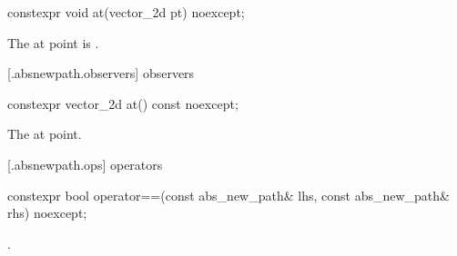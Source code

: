 %
\begin{itemdecl}
constexpr void at(vector_2d pt) noexcept;
\end{itemdecl}
\begin{itemdescr}
\pnum
\effects
The at point is .
\end{itemdescr}

 [\iotwod.absnewpath.observers]{ observers}%

%
\begin{itemdecl}
constexpr vector_2d at() const noexcept;
\end{itemdecl}
\begin{itemdescr}
\pnum
\returns
The at point.
\end{itemdescr}

 [\iotwod.absnewpath.ops]{ operators}%

%
\begin{itemdecl}
constexpr bool operator==(const abs_new_path& lhs, const abs_new_path& rhs) 
  noexcept;
\end{itemdecl}
\begin{itemdescr}
\pnum
\returns
{}.
\end{itemdescr}
